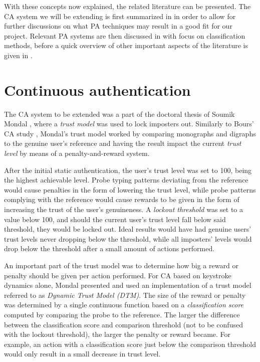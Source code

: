 With these concepts now explained, the related literature can be presented.
The CA system we will be extending is first summarized in  in order to allow for further discussions on what PA techniques may result in a good fit for our project.
Relevant PA systems are then discussed in  with focus on classification methods, before a quick overview of other important aspects of the literature is given in .

\section{Continuous authentication}
\label{sec:related-CA}
The CA system to be extended was a part of the doctoral thesis of Soumik Mondal \cite{mondal}, where a \textit{trust model} was used to lock imposters out.
Similarly to Bours' CA study \cite{BOURS201236}, Mondal's trust model worked by comparing monographs and digraphs to the genuine user's reference and having the result impact the current \textit{trust level} by means of a penalty-and-reward system.

After the initial static authentication, the user's trust level was set to 100, being the highest achievable level.
Probe typing patterns deviating from the reference would cause penalties in the form of lowering the trust level, while probe patterns complying with the reference would cause rewards to be given in the form of increasing the trust of the user's genuineness.
A \textit{lockout threshold} was set to a value below 100, and should the current user's trust level fall below said threshold, they would be locked out.
Ideal results would have had genuine users' trust levels never dropping below the threshold, while all imposters' levels would drop below the threshold after a small amount of actions performed.

An important part of the trust model was to determine how big a reward or penalty should be given per action performed.
For CA based on keystroke dynamics alone, Mondal \cite{mondal} presented and used an implementation of a trust model referred to as \textit{Dynamic Trust Model (DTM)}.
The size of the reward or penalty was determined by a single continuous function based on a \textit{classification score} computed by comparing the probe to the reference.
The larger the difference between the classification score and comparison threshold (not to be confused with the lockout threshold), the larger the penalty or reward became.
For example, an action with a classification score just below the comparison threshold would only result in a small decrease in trust level.

